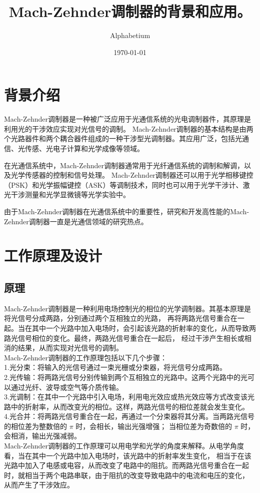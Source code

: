 \documentclass[12pt, a4paper, oneside]{article}
\title{Mach-Zehnder调制器的背景和应用。}
\date{\today}
\author{Alphabetium}
\begin{document}
\begin{spacing}{2.0}
\tableofcontents
\maketitle


\section{背景介绍}

Mach-Zehnder调制器是一种被广泛应用于光通信系统的光电调制器件，其原理是利用光的干涉效应实现对光信号的调制。
Mach-Zehnder调制器的基本结构是由两个光路器件和两个耦合器件组成的一种干涉型光调制器。其应用广泛，包括光通信、光传感、光电子计算和光学成像等领域。

在光通信系统中，Mach-Zehnder调制器通常用于光纤通信系统的调制和解调，以及光学传感器的控制和信号处理。
Mach-Zehnder调制器还可以用于光学相移键控（PSK）和光学振幅键控（ASK）等调制技术，同时也可以用于光学干涉计、激光干涉测量和光学显微镜等光学实验中。

由于Mach-Zehnder调制器在光通信系统中的重要性，研究和开发高性能的Mach-Zehnder调制器一直是光通信领域的研究热点。


\section{工作原理及设计}
\subsection{原理}
Mach-Zehnder调制器是一种利用电场控制光的相位的光学调制器。其基本原理是将光信号分成两路，分别通过两个互相独立的光路，
再将两路光信号重合在一起。当在其中一个光路中加入电场时，会引起该光路的折射率的变化，从而导致两路光信号相位的变化。最终，两路光信号重合在一起后，
经过干涉产生相长或相消的结果，从而实现对光信号的调制。
\\
Mach-Zehnder调制器的工作原理包括以下几个步骤：
\\
1.光分束：将输入的光信号通过一束光栅或分束器，将光信号分成两路。
\\
2.光传输：将两路光信号分别传输到两个互相独立的光路中。这两个光路中的光可以通过光纤、波导或空气等介质传输。
\\
3.光调制：在其中一个光路中引入电场，利用电光效应或热光效应等方式改变该光路中的折射率，从而改变光的相位。这样，两路光信号的相位差就会发生变化。
\\
4.光合并：将两路光信号重合在一起，再通过一个分束器将其分离。当两路光信号的相位差为整数倍的 $\pi$ 时，会相长，输出光强增强；
当相位差为奇数倍的 $\pi$ 时，会相消，输出光强减弱。
\\
Mach-Zehnder调制器的工作原理可以用电学和光学的角度来解释。从电学角度看，当在其中一个光路中加入电场时，该光路中的折射率发生变化，
相当于在该光路中加入了电感或电容，从而改变了电路中的阻抗。而两路光信号重合在一起时，就相当于两个电路串联，由于阻抗的改变导致电路中的电流和电压的变化，
从而产生了干涉效应。


\end{spacing}
\end{document}
